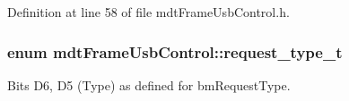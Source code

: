 Definition at line 58 of file mdt\-Frame\-Usb\-Control.\-h.

\hypertarget{classmdt_frame_usb_control_a779262a63280a282343ada50acfda3d3}{
\subsubsection[{request\-\_\-type\-\_\-t}]{\setlength{\rightskip}{0pt plus 5cm}enum {\bf mdt\-Frame\-Usb\-Control\-::request\-\_\-type\-\_\-t}}}\label{classmdt_frame_usb_control_a779262a63280a282343ada50acfda3d3}


Bits D6, D5 (Type) as defined for bm\-Request\-Type. 

